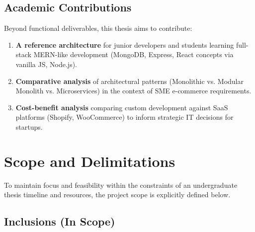 \subsection{Academic Contributions}

Beyond functional deliverables, this thesis aims to contribute:

\begin{enumerate}
    \item \textbf{A reference architecture} for junior developers and students learning full-stack MERN-like development (MongoDB, Express, React concepts via vanilla JS, Node.js).
    
    \item \textbf{Comparative analysis} of architectural patterns (Monolithic vs. Modular Monolith vs. Microservices) in the context of SME e-commerce requirements.
    
    \item \textbf{Cost-benefit analysis} comparing custom development against SaaS platforms (Shopify, WooCommerce) to inform strategic IT decisions for startups.
\end{enumerate}

\section{Scope and Delimitations}

To maintain focus and feasibility within the constraints of an undergraduate thesis timeline and resources, the project scope is explicitly defined below.

\subsection{Inclusions (In Scope)}

